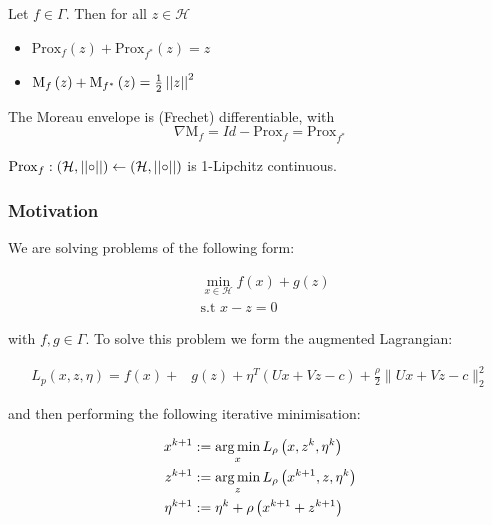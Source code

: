 \begin{theorem}
Let \(f \in \Gamma\). Then for all \(z \in \mathcal{H}\)
\begin{itemize}
\item \( \mathrm{Prox}_f\left(z\right) + \mathrm{Prox}_{f^*}\left(z\right) = z   \)
\item \( \mathrm{M}_f\left(z\right)  + \mathrm{M}_{f^*}\left(z\right)  = \frac{1}{2}\left|\left|z\right|\right|^2 \)
\end{itemize}
\end{theorem}

\begin{theorem}
The Moreau envelope is (Frechet) differentiable, with 
\begin{equation}
\nabla \mathrm{M}_f = Id - \mathrm{Prox}_{f} = \mathrm{Prox}_{f^*}
\end{equation}
\end{theorem}

\begin{theorem}
\( \mathrm{Prox}_f : \left(\mathcal{H}, \left|\left|\circ\right|\right|\right) \leftarrow \left(\mathcal{H}, \left|\left|\circ\right|\right|\right) \) is 1-Lipchitz continuous.
\end{theorem}

\subsubsection{Motivation}
We are solving problems of the following form:

\begin{align}
&\min_{x \in \mathcal{H}} f\left(x\right) + g\left(z\right)\\
&\text{s.t } x - z = 0
\end{align}

with \(f, g \in \Gamma\). To solve this problem we form the augmented Lagrangian: 

\begin{align*}
L_p\left(x, z, \eta\right) = f\left( x\right) +& g\left(z\right)+\eta^T\left(Ux+Vz-c\right) + \frac{\rho}{2}\|Ux+Vz-c\|_2^2
\end{align*}

and then performing the following iterative minimisation:

\begin{align}
x^{k+1} &:= \operatorname*{arg\,min}_{x} L_\rho\left(x,z^k,\eta^k\right)\\
z^{k+1} &:= \operatorname*{arg\,min}_{z} L_\rho\left(x^{k+1},z,\eta^k\right)\\
\eta^{k+1} &:= \eta^{k} + \rho \left(x^{k+1} + z^{k+1}\right)
\end{align}

